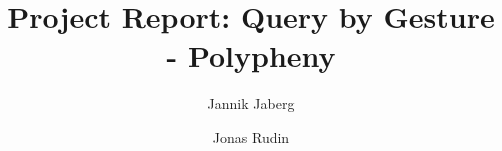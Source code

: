 \title{Project Report: Query by Gesture - Polypheny} %
\author{Jannik Jaberg \and Jonas Rudin} %

\institute{\lectureInstitute} %
\begin{report}











\end{report}

